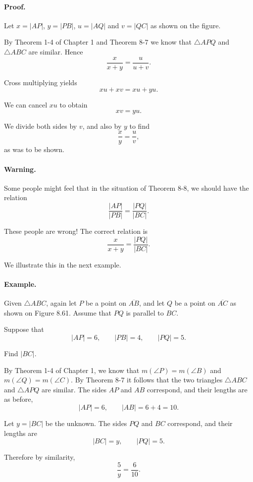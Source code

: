 \documentclass[12pt]{book} %
\begin{document}
\paragraph{Proof.}
Let $x=|AP|$, $y=|PB|$, $u=|AQ|$ and $v=|QC|$ as shown on the figure.


By Theorem 1-4 of Chapter 1 and Theorem 8-7 we know that $\triangle APQ$ and $\triangle ABC$ are similar. Hence
\[
\frac{x}{x+y}=\frac{u}{u+v}.
\]

Cross multiplying yields
\[
xu+xv=xu+yu.
\]

We can cancel $xu$ to obtain
\[
xv=yu.
\]

We divide both sides by $v$, and also by $y$ to find
\[
\frac{x}{y}=\frac{u}{v},
\]
as was to be shown.

\paragraph{Warning.}
Some people might feel that in the situation of Theorem 8-8, we should have the relation
\[
\frac{|AP|}{|PB|}=\frac{|PQ|}{|BC|}.
\]

These people are wrong! The correct relation is
\[
\frac{x}{x+y}=\frac{|PQ|}{|BC|}.
\]

We illustrate this in the next example.

\paragraph{Example.}
Given $\triangle ABC$, again let $P$ be a point on $\overline{AB}$, and let $Q$ be a point on $\overline{AC}$ as shown on Figure 8.61. Assume that $PQ$ is parallel to $BC$.


Suppose that
\[
|AP|=6,\qquad |PB|=4,\qquad |PQ|=5.
\]

Find $|BC|$.

By Theorem 1-4 of Chapter 1, we know that $m(\angle P)=m(\angle B)$ and $m(\angle Q)=m(\angle C)$. By Theorem 8-7 it follows that the two triangles $\triangle ABC$ and $\triangle APQ$ are similar. The sides $AP$ and $AB$ correspond, and their lengths are as before,
\[
|AP|=6,\qquad |AB|=6+4=10.
\]

Let $y=|BC|$ be the unknown. The sides $PQ$ and $BC$ correspond, and their lengths are
\[
|BC|=y,\qquad |PQ|=5.
\]

Therefore by similarity,
\[
\frac{5}{y}=\frac{6}{10}.
\]
\end{document}
